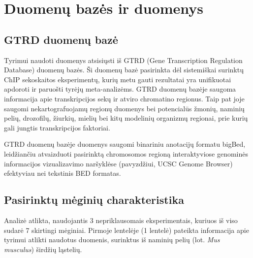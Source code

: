 \documentclass[12pt]{article}
\begin{document}
\newpage


\section{Duomenų bazės ir duomenys}
\subsection{GTRD duomenų bazė}
Tyrimui naudoti duomenys atsisiųsti iš GTRD (Gene Transcription Regulation
Database)\cite{GTRD} duomenų bazės. Ši duomenų bazė pasirinkta dėl sistemiškai
surinktų ChIP sekoskaitos eks\-pe\-ri\-men\-tų, kurių metu gauti rezultatai yra
unifikuotai apdoroti ir paruošti tyrėjų meta-analizėms. GTRD duomenų bazėje
saugoma informacija apie transkripcijos sekų ir atviro chromatino regionus.
Taip pat joje saugomi nekartografuojamų regionų duomenys bei potencialūs
žmonių, naminių pelių, drozofilų, žiurkių, mielių bei kitų modelinių
organizmų regionai, prie kurių gali jungtis transkripcijos faktoriai.

GTRD duomenų bazėje duomenys saugomi binariniu anotacijų formatu bigBed,
leidžiančiu atvaizduoti pasirinktą chromosomos regioną interaktyviose genominės
informacijos vizualizavimo naršyklėse (pavyzdžiui, UCSC Genome
Browser\cite{UCSCGB}) efektyviau nei tekstinis BED formatas.

\subsection{Pasirinktų mėginių charakteristika}
Analizė atlikta, naudojantis 3 nepriklausomais eksperimentais, kuriuos iš viso
sudarė 7 skirtingi mėginiai. Pirmoje lentelėje (1 lentelė) pateikta informacija
apie tyrimui atlikti naudotus duomenis, surinktus iš naminių pelių
(lot. \emph{Mus musculus}) širdžių ląstelių.
\end{document}
